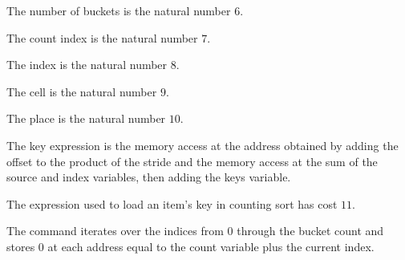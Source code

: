 \begin{definition}
\label{Light.CountSort.Buckets}
\leanok
{}
The number of buckets is the natural number $6$.
\end{definition}

\begin{definition}
\label{Light.CountSort.Cnt}
\leanok
{}
The count index is the natural number $7$.
\end{definition}

\begin{definition}
\label{Light.CountSort.Idx}
\leanok
{}
The index is the natural number $8$.
\end{definition}

\begin{definition}
\label{Light.CountSort.Cell}
\leanok
{}
The cell is the natural number $9$.
\end{definition}

\begin{definition}
\label{Light.CountSort.Place}
\leanok
{}
The place is the natural number $10$.
\end{definition}

\begin{definition}
\label{Light.csKey}
\leanok
{}
The key expression is the memory access at the address obtained by adding the offset to
the product of the stride and the memory access at the sum of the source and index
variables, then adding the keys variable.
\end{definition}

\begin{theorem}
\label{Light.csKey_cost}
\leanok
{}
The expression used to load an item's key in counting sort has cost $11$.
\end{theorem}

\begin{definition}
\label{Light.csZero}
\leanok
{}
The command iterates over the indices from $0$ through the bucket count and stores $0$
at each address equal to the count variable plus the current index.
\end{definition}

